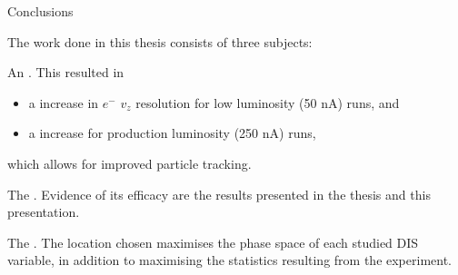 \begin{frame}{Conclusions}
    \label{12.31::conclusions}

    The work done in this thesis consists of three subjects:

    \vspace{12pt}

    An .
    This resulted in
    \begin{itemize}
        \item
            a  increase in $e^-$ $v_z$ resolution for low luminosity (50 nA) runs, and

        \item
            a  increase for production luminosity (250 nA) runs,
    \end{itemize}
    which allows for improved particle tracking.

    \vspace{12pt}

    The .
    Evidence of its efficacy are the results presented in the thesis and this presentation.

    \vspace{12pt}

    The .
    The location chosen maximises the phase space of each studied DIS variable, in addition to maximising the statistics resulting from the experiment.
\end{frame}
